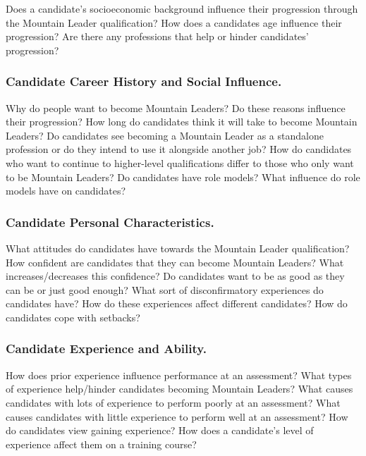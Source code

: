 \documentclass[
  12pt,
  a4paper,
]{book}
\begin{document}
Does a candidate's socioeconomic background influence their progression through the Mountain Leader qualification? How does a candidates age influence their progression? Are there any professions that help or hinder candidates' progression?

\hypertarget{qual-research-questions-career}{%
\subsubsection{Candidate Career History and Social Influence.}\label{qual-research-questions-career}}

Why do people want to become Mountain Leaders? Do these reasons influence their progression? How long do candidates think it will take to become Mountain Leaders? Do candidates see becoming a Mountain Leader as a standalone profession or do they intend to use it alongside another job? How do candidates who want to continue to higher-level qualifications differ to those who only want to be Mountain Leaders? Do candidates have role models? What influence do role models have on candidates?

\hypertarget{qual-research-questions-personality}{%
\subsubsection{Candidate Personal Characteristics.}\label{qual-research-questions-personality}}

What attitudes do candidates have towards the Mountain Leader qualification? How confident are candidates that they can become Mountain Leaders? What increases/decreases this confidence? Do candidates want to be as good as they can be or just good enough? What sort of disconfirmatory experiences do candidates have? How do these experiences affect different candidates? How do candidates cope with setbacks?

\hypertarget{qual-research-questions-experience}{%
\subsubsection{Candidate Experience and Ability.}\label{qual-research-questions-experience}}

How does prior experience influence performance at an assessment? What types of experience help/hinder candidates becoming Mountain Leaders? What causes candidates with lots of experience to perform poorly at an assessment? What causes candidates with little experience to perform well at an assessment? How do candidates view gaining experience? How does a candidate's level of experience affect them on a training course?
\end{document}

